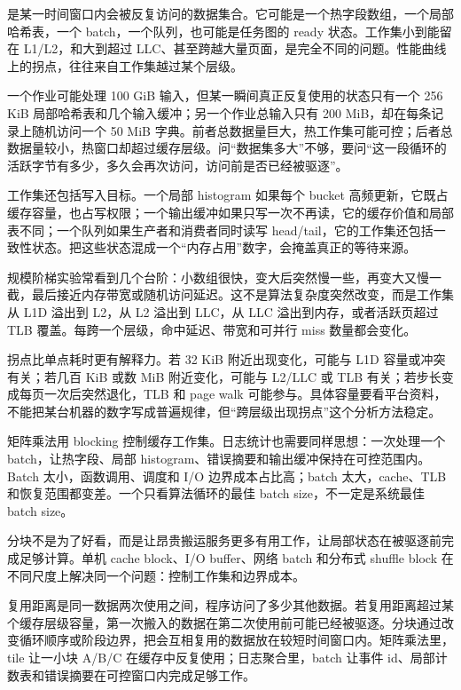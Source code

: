  是某一时间窗口内会被反复访问的数据集合。它可能是一个热字段数组，一个局部哈希表，一个 batch，一个队列，也可能是任务图的 ready 状态。工作集小到能留在 L1/L2，和大到超过 LLC、甚至跨越大量页面，是完全不同的问题。性能曲线上的拐点，往往来自工作集越过某个层级。

一个作业可能处理 100 GiB 输入，但某一瞬间真正反复使用的状态只有一个 256 KiB 局部哈希表和几个输入缓冲；另一个作业总输入只有 200 MiB，却在每条记录上随机访问一个 50 MiB 字典。前者总数据量巨大，热工作集可能可控；后者总数据量较小，热窗口却超过缓存层级。问“数据集多大”不够，要问“这一段循环的活跃字节有多少，多久会再次访问，访问前是否已经被驱逐”。

工作集还包括写入目标。一个局部 histogram 如果每个 bucket 高频更新，它既占缓存容量，也占写权限；一个输出缓冲如果只写一次不再读，它的缓存价值和局部表不同；一个队列如果生产者和消费者同时读写 head/tail，它的工作集还包括一致性状态。把这些状态混成一个“内存占用”数字，会掩盖真正的等待来源。

规模阶梯实验常看到几个台阶：小数组很快，变大后突然慢一些，再变大又慢一截，最后接近内存带宽或随机访问延迟。这不是算法复杂度突然改变，而是工作集从 L1D 溢出到 L2，从 L2 溢出到 LLC，从 LLC 溢出到内存，或者活跃页超过 TLB 覆盖。每跨一个层级，命中延迟、带宽和可并行 miss 数量都会变化。

拐点比单点耗时更有解释力。若 32 KiB 附近出现变化，可能与 L1D 容量或冲突有关；若几百 KiB 或数 MiB 附近变化，可能与 L2/LLC 或 TLB 有关；若步长变成每页一次后突然退化，TLB 和 page walk 可能参与。具体容量要看平台资料，不能把某台机器的数字写成普遍规律，但“跨层级出现拐点”这个分析方法稳定。

矩阵乘法用 blocking 控制缓存工作集。日志统计也需要同样思想：一次处理一个 batch，让热字段、局部 histogram、错误摘要和输出缓冲保持在可控范围内。Batch 太小，函数调用、调度和 I/O 边界成本占比高；batch 太大，cache、TLB 和恢复范围都变差。一个只看算法循环的最佳 batch size，不一定是系统最佳 batch size。

分块不是为了好看，而是让昂贵搬运服务更多有用工作，让局部状态在被驱逐前完成足够计算。单机 cache block、I/O buffer、网络 batch 和分布式 shuffle block 在不同尺度上解决同一个问题：控制工作集和边界成本。

复用距离是同一数据两次使用之间，程序访问了多少其他数据。若复用距离超过某个缓存层级容量，第一次搬入的数据在第二次使用前可能已经被驱逐。分块通过改变循环顺序或阶段边界，把会互相复用的数据放在较短时间窗口内。矩阵乘法里，tile 让一小块 A/B/C 在缓存中反复使用；日志聚合里，batch 让事件 id、局部计数表和错误摘要在可控窗口内完成足够工作。

